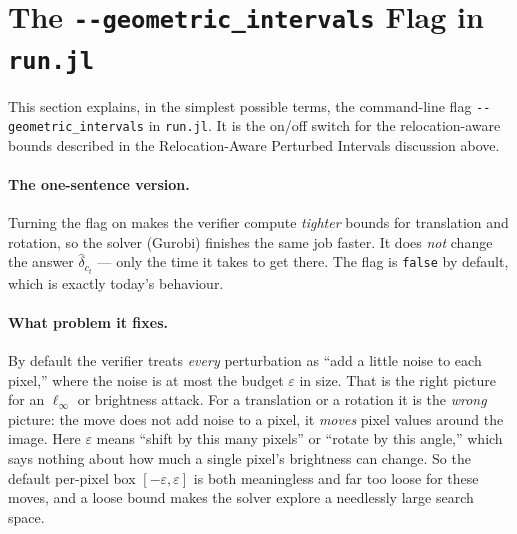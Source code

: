\documentclass[11pt]{article}
\newcommand{\ep}{\varepsilon}
\begin{document}
\section{The \texttt{-{}-geometric\_intervals} Flag in \texttt{run.jl}}
\label{sec:geom_flag}

This section explains, in the simplest possible terms, the command-line flag
\texttt{-{}-geometric\_intervals} in \texttt{run.jl}. It is the on/off switch for the
relocation-aware bounds described in the Relocation-Aware Perturbed Intervals discussion above.

\paragraph{The one-sentence version.}
Turning the flag on makes the verifier compute \emph{tighter} bounds for translation and rotation,
so the solver (Gurobi) finishes the same job faster. It does \emph{not} change the answer
$\hat{\delta}_{c_t}$ --- only the time it takes to get there. The flag is \texttt{false} by default,
which is exactly today's behaviour.

\paragraph{What problem it fixes.}
By default the verifier treats \emph{every} perturbation as ``add a little noise to each pixel,''
where the noise is at most the budget $\ep$ in size. That is the right picture for an $\ell_\infty$
or brightness attack. For a translation or a rotation it is the \emph{wrong} picture: the move does
not add noise to a pixel, it \emph{moves} pixel values around the image. Here $\ep$ means ``shift by
this many pixels'' or ``rotate by this angle,'' which says nothing about how much a single pixel's
brightness can change. So the default per-pixel box $[-\ep,\ep]$ is both meaningless and far too loose
for these moves, and a loose bound makes the solver explore a needlessly large search space.
\end{document}

